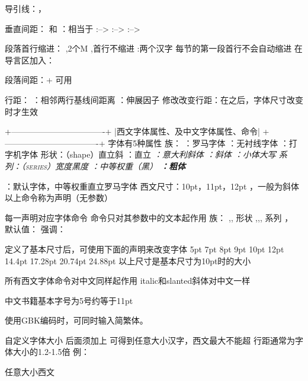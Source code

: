 导引线：\dotfill，\hrulefill 
 
垂直间距： 
\vspace{高度}和\vspace*{高度} 
\vfill：相当于\vspace{\fill} 
\smallskip:-->\vspace{\smallskipamount} 
\medskip:-->\vspace{\medskipamount} 
\bigskip:-->\vspace{\bigskipamount} 
 
段落首行缩进： 
\setlength{\parindent}{2em},2个M 
\setlength{\parindent}{0pt},首行不缩进 
\CJKindent:两个汉字 
\noindent 
每节的第一段首行不会自动缩进 
\hspane{\parindent} 
在导言区加入：\usepackage{indentfirst} 
 
段落间距：\lineskip+\parskip 
可用 
 
行距： 
\baselineskip：相邻两行基线间距离 
\baselinestretch：伸展因子 
修改改变行距：\renewcommand{\baselinestretch}[1.2] 
放在之后，字体尺寸改变时才生效 
 
  
 
 
+----------------------------------+ 
|西文字体属性、及中文字体属性、命令| 
+----------------------------------+ 
字体有5种属性 
族： 
\rmfamily：罗马字体 
\sffamily：无衬线字体 
\ttfamily：打字机字体 
形状：（shape）直立斜 
\upshape：直立 
\itshape：意大利斜体 
\slshape：斜体 
\scshape：小体大写 
系列：（series）宽度黑度 
\mdseries：中等权重（黑） 
\bfseries：粗体 
 
\normalfont：默认字体，中等权重直立罗马字体 
西文尺寸：10pt，11pt，12pt 
，一般为斜体 
以上命令称为声明（无参数） 
 
每一声明对应字体命令 
命令只对其参数中的文本起作用 
族： 
\testrm{},\testsf{},\testtt{} 
形状 
\textup{},\textit{},\textsl{},\textsc{} 
系列 
\textmd{}，\textbf{} 
默认值：\textnormal{} 
强调：\emph{} 
 
定义了基本尺寸后，可使用下面的声明来改变字体 
\tiny  5pt 
\scriptsize 7pt 
\footnotesize 8pt 
\small  9pt 
\normalsize 10pt 
\large  12pt 
\Large  14.4pt 
\LARGE  17.28pt 
\huge  20.74pt 
\Huge  24.88pt 
以上尺寸是基本尺寸为10pt时的大小 
 
所有西文字体命令对中文同样起作用 
italic和slanted斜体对中文一样 
 
中文书籍基本字号为5号约等于11pt 
 
使用GBK编码时，可同时输入简繁体。 
 
自定义字体大小 
\fontsize{字体尺寸}{行距}后面须加上 
可得到任意大小汉字，西文最大不能超\Huge 
行距通常为字体大小的1.2-1.5倍 
例：\fontsize{12pt}{\baselineskip}\selectfont 
\usepackage{type1cm}任意大小西文 
 
